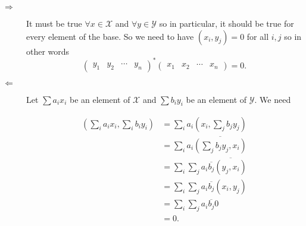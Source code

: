 \begin{solution}
  \begin{description}
    \item[$\Rightarrow$]
      It must be true $\forall x \in \mathcal{X}$ and $\forall y \in \mathcal{Y}$ so in particular,
      it should be true for every element of the base.
      So we need to have $(x_i,y_j) = 0$ for all $i,j$ so in other words
      \[
        \begin{pmatrix}
          y_1 & y_2 & \cdots & y_n
        \end{pmatrix}^*
        \begin{pmatrix}
          x_1 & x_2 & \cdots & x_n
        \end{pmatrix}
        = 0.
      \]
    \item[$\Leftarrow$]
      Let $\sum a_ix_i$ be an element of $\mathcal{X}$ and $\sum b_iy_i$ be an element of $\mathcal{Y}$.
      We need

      \begin{align*}
        (\sum_i a_ix_i, \sum_i b_iy_i)
        & = \sum_i a_i (x_i, \sum_j b_jy_j)\\
        & = \sum_i a_i \overline{(\sum_j b_jy_j, x_i)}\\
        & = \sum_i \sum_j a_i\overline{b_j} \overline{(y_j, x_i)}\\
        & = \sum_i \sum_j a_i\overline{b_j} (x_i, y_j)\\
        & = \sum_i \sum_j a_i \overline{b_j} 0\\
        & = 0.
      \end{align*}
  \end{description}
\end{solution}

